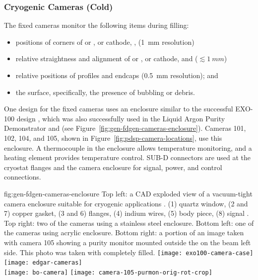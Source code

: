 \subsubsection{Cryogenic Cameras (Cold)}

The fixed cameras
monitor the following items during filling:
\begin{itemize}
\item positions of corners of  or ,  or cathode, ,  (\SI{1}{mm} resolution)
\item relative straightness and alignment of  or ,  or cathode, and  (\(\lesssim\SI{1}{mm}\))
\item relative positions of profiles and endcaps (\SI{0.5}{mm} resolution); and 
\item the  surface, specifically, the presence of bubbling or debris.
\end{itemize}




One design for the  fixed cameras uses an enclosure similar to
the successful EXO-100 design \cite{Delaquis:2013hva}, which was also
successfully used in the Liquid Argon Purity Demonstrator
and  (see Figure~\ref{fig:gen-fdgen-cameras-enclosure}). Cameras 101, 102, 104, and 105, shown in Figure~\ref{fig:pdsp-camera-locations}, use this enclosure.
A thermocouple in the enclosure allows temperature monitoring, and a heating element provides temperature control.  
SUB-D connectors are used at the cryostat flanges and the camera enclosure for signal, power, and control connections.

\begin{dunefigure}{fig:gen-fdgen-cameras-enclosure}
  {Top left: a CAD exploded view of a vacuum-tight camera enclosure suitable for cryogenic applications \cite{Delaquis:2013hva}.
    (1) quartz window, (2 and 7) copper gasket, (3 and 6) flanges, (4) indium wires, (5) body piece, (8) signal \fdth.
    Top right: two of the  cameras using a stainless steel enclosure. 
    Bottom left: one of the  cameras using acrylic enclosure.
    Bottom right: a portion of an image taken with  camera 105 showing a purity monitor mounted outside the  on the beam left side. This photo was taken with  completely filled.
  }
  \texttt{[image: exo100-camera-case]}%
  \texttt{[image: edgar-cameras]}\\
  \hfill \texttt{[image: bo-camera]}%
  \hfill \texttt{[image: camera-105-purmon-orig-rot-crop]}%
  \hfill
\end{dunefigure}


